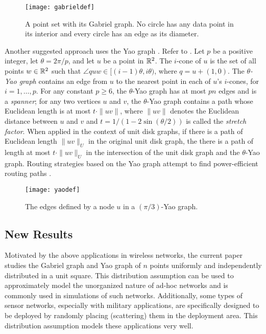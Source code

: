 \documentclass[lotsofwhite,charterfonts]{patmorin}
\begin{document}
\begin{figure}
\begin{center}{\texttt{[image: gabrieldef]}}\end{center}
\caption{A point set with its Gabriel graph. No circle has
any data point in its interior and every circle has an edge
as its diameter.}
\end{figure}

Another suggested approach uses the Yao graph \cite{y82}. Refer to
. Let $p$ be a positive integer, let $\theta=2\pi/p$, and
let $u$ be a point in $\mathbb{R}^2$.  The $i$-cone of $u$ is the set of all points
$w\in\mathbb{R}^2$ such that $\angle quw \in [(i-1)\theta,i\theta)$, where $q =
u+(1,0)$.  The \emph{$\theta$-Yao graph} contains an edge from $u$ to the
nearest point in each of $u$'s $i$-cones, for $i=1,\ldots,p$.  For any
constant $p\ge 6$, the $\theta$-Yao graph has at most $pn$ edges and is a
\emph{spanner}; for any two vertices $u$ and $v$, the $\theta$-Yao graph
contains a path whose Euclidean length is at most $t\cdot\|uv\|$, where
$\|uv\|$ denotes the Euclidean distance between $u$ and $v$ and
$t=1/(1-2\sin(\theta/2))$ is called the \emph{stretch factor}.  When applied in
the context of unit disk graphs, if there is a path of Euclidean length
$\|uv\|_U$ in the original unit disk graph, the there is a path of length
at most $t\cdot\|uv\|_U$ in the intersection of the unit disk graph and the
$\theta$-Yao graph.  Routing strategies based on the Yao graph attempt to
find power-efficient routing paths \cite{glsv02,lwy01,wlbw01,svz07}.

\begin{figure}
\begin{center}{\texttt{[image: yaodef]}}\end{center}
\caption{The edges defined by a node $u$ in a $(\pi/3)$-Yao graph.}
\end{figure}


\subsection{New Results}

Motivated by the above applications in wireless networks, the current paper
studies the Gabriel graph and Yao graph of $n$ points uniformly and
independently distributed in a unit square.  This distribution assumption
can be used to approximately model the unorganized nature of ad-hoc
networks and is commonly used in simulations of such networks.
Additionally, some types of sensor networks, especially with military
applications, are specifically designed to be deployed by randomly placing
(scattering) them in the deployment area. This distribution assumption models these
applications very well.
\end{document}
